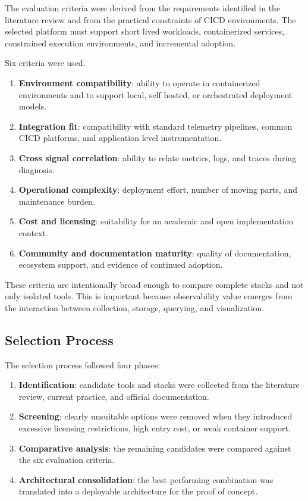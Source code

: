 The evaluation criteria were derived from the requirements identified in the literature review and from the practical constraints of \gls{CICD} environments. The selected platform must support short lived workloads, containerized services, constrained execution environments, and incremental adoption.

Six criteria were used.

\begin{enumerate}
    \item \textbf{Environment compatibility}: ability to operate in containerized environments and to support local, self hosted, or orchestrated deployment models.
    \item \textbf{Integration fit}: compatibility with standard telemetry pipelines, common \gls{CICD} platforms, and application level instrumentation.
    \item \textbf{Cross signal correlation}: ability to relate metrics, logs, and traces during diagnosis.
    \item \textbf{Operational complexity}: deployment effort, number of moving parts, and maintenance burden.
    \item \textbf{Cost and licensing}: suitability for an academic and open implementation context.
    \item \textbf{Community and documentation maturity}: quality of documentation, ecosystem support, and evidence of continued adoption.
\end{enumerate}

These criteria are intentionally broad enough to compare complete stacks and not only isolated tools. This is important because observability value emerges from the interaction between collection, storage, querying, and visualization.

\subsection{Selection Process}
\label{subsec:selection_process}

The selection process followed four phases:
\begin{enumerate}
    \item \textbf{Identification}: candidate tools and stacks were collected from the literature review, current practice, and official documentation.
    \item \textbf{Screening}: clearly unsuitable options were removed when they introduced excessive licensing restrictions, high entry cost, or weak container support.
    \item \textbf{Comparative analysis}: the remaining candidates were compared against the six evaluation criteria.
    \item \textbf{Architectural consolidation}: the best performing combination was translated into a deployable architecture for the proof of concept.
\end{enumerate}

